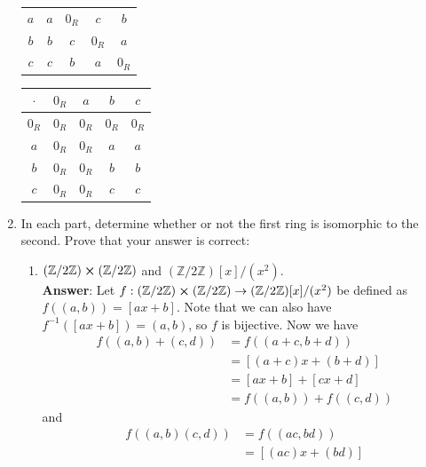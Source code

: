 \documentclass{article}
\begin{document}
\begin{enumerate}
\begin{center}
\begin{tabular}{c|c c c c}
                        $a$   & $a$   & $0_R$ & $c$   & $b$   \\
                        $b$   & $b$   & $c$   & $0_R$ & $a$   \\
                        $c$   & $c$   & $b$   & $a$   & $0_R$
                  \end{tabular}\qquad
                  \begin{tabular}{c|c c c c}
                        $\cdot$ & $0_R$ & $a$   & $b$   & $c$   \\
                        \hline
                        $0_R$   & $0_R$ & $0_R$ & $0_R$ & $0_R$ \\
                        $a$     & $0_R$ & $0_R$ & $a$   & $a$   \\
                        $b$     & $0_R$ & $0_R$ & $b$   & $b$   \\
                        $c$     & $0_R$ & $0_R$ & $c$   & $c$
                  \end{tabular}
            \end{center}
      \item In each part, determine whether or not the first ring is isomorphic to the second. Prove that your answer is correct:
            \begin{enumerate}
                  \item $(\mathbb{Z}/2\mathbb{Z})\cross(\mathbb{Z}/2\mathbb{Z})$ and $(\mathbb{Z}/2\mathbb{Z})[x]/(x^2)$.\\
                        \textbf{Answer}: Let $f:(\mathbb{Z}/2\mathbb{Z})\cross(\mathbb{Z}/2\mathbb{Z})\rightarrow(\mathbb{Z}/2\mathbb{Z})[x]/(x^2)$ be defined as $f((a,b))=[ax+b]$. Note that we can also have $f^{-1}([ax+b])=(a,b)$, so $f$ is bijective. Now we have \begin{align*}
                              f((a,b)+(c,d)) & =f((a+c,b+d))      \\
                                             & =[(a+c)x+(b+d)]    \\
                                             & =[ax+b]+[cx+d]     \\
                                             & =f((a,b))+f((c,d))
                        \end{align*}
                        and
                        \begin{align*}
                              f((a,b)(c,d)) & =f((ac,bd))       \\
                                            & =[(ac)x+(bd)]     \\

\end{align*}
\end{enumerate}
\end{enumerate}
\end{document}

